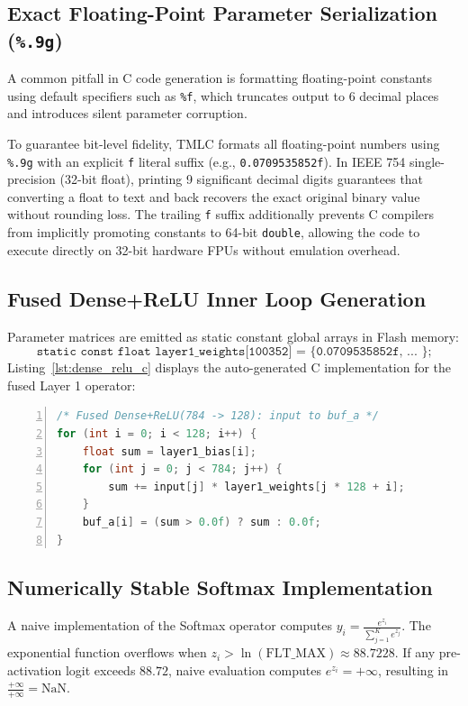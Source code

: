 \documentclass[11pt,a4paper]{article}
\begin{document}
\subsection{Exact Floating-Point Parameter Serialization (\texttt{\%.9g})}
A common pitfall in C code generation is formatting floating-point constants using default specifiers such as \texttt{\%f}, which truncates output to 6 decimal places and introduces silent parameter corruption.

To guarantee bit-level fidelity, TMLC formats all floating-point numbers using \texttt{\%.9g} with an explicit \texttt{f} literal suffix (e.g., \texttt{0.0709535852f}). In IEEE 754 single-precision (32-bit float), printing 9 significant decimal digits guarantees that converting a float to text and back recovers the exact original binary value without rounding loss. The trailing \texttt{f} suffix additionally prevents C compilers from implicitly promoting constants to 64-bit \texttt{double}, allowing the code to execute directly on 32-bit hardware FPUs without emulation overhead.

\subsection{Fused Dense+ReLU Inner Loop Generation}
Parameter matrices are emitted as static constant global arrays in Flash memory:
\begin{equation}
    \texttt{static const float layer1\_weights[100352] = \{ 0.0709535852f, ... \};}
\end{equation}
Listing~\ref{lst:dense_relu_c} displays the auto-generated C implementation for the fused Layer 1 operator:
\begin{lstlisting}[language=C, caption={Auto-Generated Fused Dense+ReLU Kernel in \texttt{model.c}}, label={lst:dense_relu_c}, basicstyle=\ttfamily\footnotesize, frame=single, numbers=left]
/* Fused Dense+ReLU(784 -> 128): input to buf_a */
for (int i = 0; i < 128; i++) {
    float sum = layer1_bias[i];
    for (int j = 0; j < 784; j++) {
        sum += input[j] * layer1_weights[j * 128 + i];
    }
    buf_a[i] = (sum > 0.0f) ? sum : 0.0f;
}
\end{lstlisting}

\subsection{Numerically Stable Softmax Implementation}
A naive implementation of the Softmax operator computes $y_i = \frac{e^{z_i}}{\sum_{j=1}^K e^{z_j}}$. The exponential function overflows when $z_i > \ln(\text{FLT\_MAX}) \approx 88.7228$. If any pre-activation logit exceeds $88.72$, naive evaluation computes $e^{z_i} = +\infty$, resulting in $\frac{+\infty}{+\infty} = \text{NaN}$.
\end{document}
